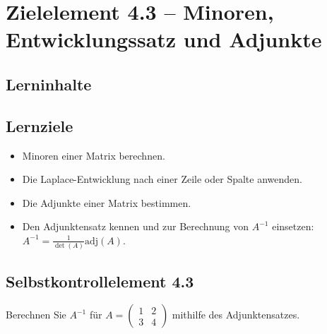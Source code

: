 \documentclass[a4paper,12pt]{article}
\begin{document}
\newpage

\section*{Zielelement 4.3 -- Minoren, Entwicklungssatz und Adjunkte}

\subsection*{Lerninhalte}
\begin{center}
\end{center}

\subsection*{Lernziele}
\begin{itemize}
  \item Minoren einer Matrix berechnen.
  \item Die Laplace-Entwicklung nach einer Zeile oder Spalte anwenden.
  \item Die Adjunkte einer Matrix bestimmen.
  \item Den Adjunktensatz kennen und zur Berechnung von $A^{-1}$ einsetzen: $A^{-1} = \frac{1}{\det(A)}\mathrm{adj}(A)$.
\end{itemize}

\subsection*{Selbstkontrollelement 4.3}
Berechnen Sie $A^{-1}$ für $A = \begin{pmatrix}1&2\\3&4\end{pmatrix}$ mithilfe des Adjunktensatzes.
\end{document}

